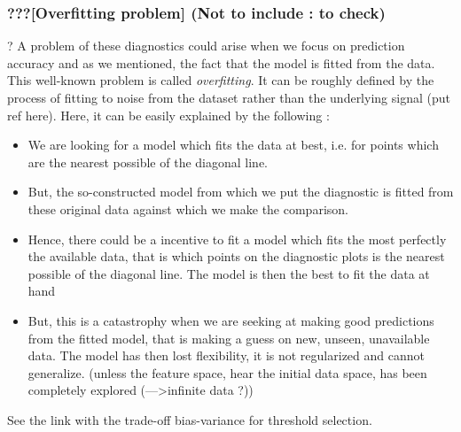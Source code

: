 \subsubsection*{???[Overfitting problem] (Not to include : to check)} \cite{northrop_cross_2016}?
A problem of these diagnostics could arise when we focus on prediction accuracy and as we mentioned, the fact that the model is fitted from the data. This well-known problem is called \emph{overfitting}. It can be roughly defined by the process of fitting to noise from the dataset rather than the underlying signal (put ref here). Here, it can be easily explained by the following :
\begin{itemize}
	
	\item We are looking for a model which fits the data at best, i.e. for points which are the nearest possible of the diagonal line.
	
	\item But, the so-constructed model from which we put the diagnostic is fitted from these original data against which we make the comparison.
	
	\item Hence, there could be a incentive to fit a model which fits the most perfectly the available data, that is which points on the diagnostic plots is the nearest possible of the diagonal line. The model is then the best to fit the data at hand
	
	\item But, this is a catastrophy when we are seeking at making good predictions from the fitted model, that is making a guess on new, unseen, unavailable data. The model has then lost flexibility, it is not regularized and cannot generalize. (unless the feature space, hear the initial data space, has been completely explored (--->infinite data ?))
\end{itemize}
See the link with the trade-off bias-variance for threshold selection.
